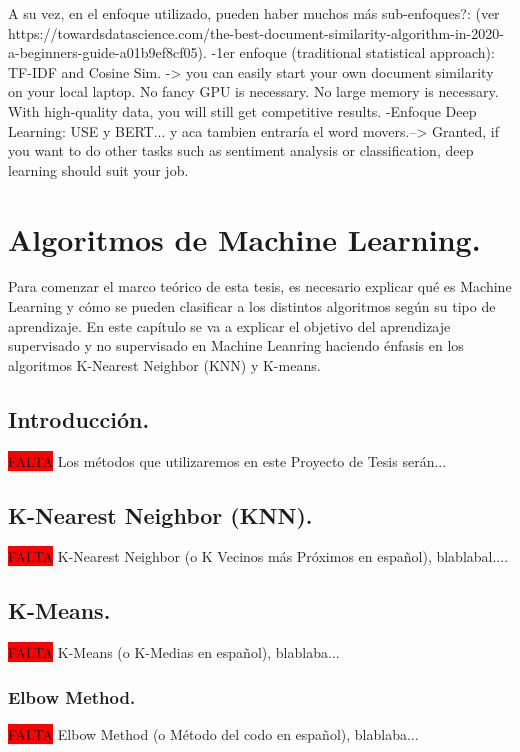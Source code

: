 \documentclass[12pt,a4paper]{article}
\begin{document}
A su vez, en el enfoque utilizado, pueden haber muchos más sub-enfoques?: (ver https://towardsdatascience.com/the-best-document-similarity-algorithm-in-2020-a-beginners-guide-a01b9ef8cf05).
            -1er enfoque (traditional statistical approach): TF-IDF and Cosine Sim. -> you can easily start your own document similarity on your local laptop. No fancy GPU is necessary. No large memory is                 necessary. With high-quality data, you will still get competitive results.
            -Enfoque Deep Learning: USE y  BERT... y aca tambien entraría el word movers.--> Granted, if you want to do other tasks such as sentiment analysis or classification, deep learning should suit your job.





\section{Algoritmos de Machine Learning.}
Para comenzar el marco teórico de esta tesis, es necesario explicar qué es Machine Learning y cómo se pueden clasificar a los distintos algoritmos según su tipo de aprendizaje. 
En este capítulo se va a explicar el objetivo del aprendizaje supervisado y no supervisado en Machine Leanring haciendo énfasis en los algoritmos K-Nearest Neighbor (KNN) y K-means.

\subsection{Introducción.}
\colorbox{red}{FALTA}
Los métodos que utilizaremos en este Proyecto de Tesis serán...

\subsection{K-Nearest Neighbor (KNN).}
\colorbox{red}{FALTA}
K-Nearest Neighbor (o K Vecinos más Próximos en español), blablabal....

\subsection{K-Means.}
\colorbox{red}{FALTA}
K-Means (o K-Medias en español), blablaba...

\subsubsection{Elbow Method.}
\colorbox{red}{FALTA}
Elbow Method (o Método del codo en español), blablaba...
\end{document}
